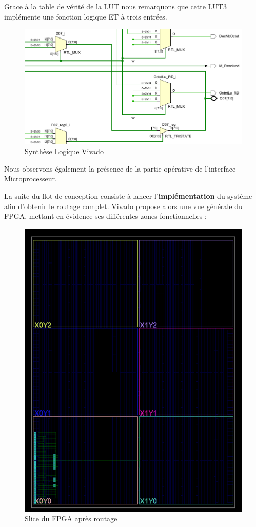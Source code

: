 Grace à la table de vérité de la LUT nous remarquons que cette LUT3 implémente une fonction logique ET à trois entrées.
\newline

\begin{figure}[H]
    \centering
    \includegraphics[width=0.8\linewidth]{images/Routage/Mux_Tris_Vivado.png}
    \caption{Synthèse Logique Vivado}
    \label{fig:rout_general}
\end{figure}

Nous observons également la présence de la partie opérative de l'interface Microprocesseur.
\newline

\medskip

La suite du flot de conception consiste à lancer l'\textbf{implémentation} du système afin d'obtenir le routage complet. 
Vivado propose alors une vue générale du FPGA, mettant en évidence ses différentes zones fonctionnelles :  

\begin{figure}[H]
    \centering
    \includegraphics[width=0.8\linewidth]{images/Routage/Rout_1.png}
    \caption{Slice du FPGA après routage}
    \label{fig:rout_general}
\end{figure}

